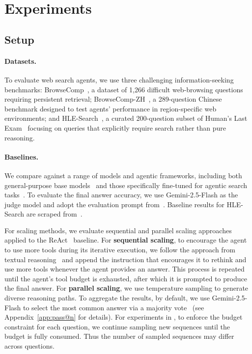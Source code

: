 \section{Experiments}\label{sec:exp}



\subsection{Setup}

\paragraph{Datasets.}To evaluate web search agents, we use three challenging information-seeking benchmarks: BrowseComp~\citep{DBLP:journals/corr/abs-2504-12516}, a dataset of 1,266 difficult web-browsing questions requiring persistent retrieval; BrowseComp-ZH~\citep{DBLP:journals/corr/abs-2504-19314}, a 289-question Chinese benchmark designed to test agents’ performance in region-specific web environments; and HLE-Search~\citep{DBLP:journals/corr/abs-2507-16075}, a curated 200-question subset of Human’s Last Exam~\citep{DBLP:journals/corr/abs-2501-14249} focusing on queries that explicitly require search rather than pure reasoning. 


\paragraph{Baselines.}
We compare \method against a range of models and agentic frameworks, including both general-purpose base models~\citep{DBLP:journals/corr/abs-2410-21276, DBLP:journals/corr/abs-2412-16720, gemini25, anthropic2025claude37sonnet, anthropic2025claude4} and those specifically fine-tuned for agentic search tasks~\citep{DBLP:journals/corr/abs-2507-02592, Liu2025WebExplorerEA, DBLP:journals/corr/abs-2508-07976,lu2025deepdiveadvancingdeepsearch}.
To evaluate the final answer accuracy, we use Gemini-2.5-Flash as the judge model and adopt the evaluation prompt from~\citet{DBLP:journals/corr/abs-2501-14249}. Baseline results for HLE-Search are scraped from~\citet{DBLP:journals/corr/abs-2507-16075}.

For scaling methods, we evaluate sequential and parallel scaling approaches applied to the ReAct~\citep{DBLP:conf/iclr/YaoZYDSN023} baseline.
For \textbf{sequential scaling}, to encourage the agent to use more tools during its iterative execution, we follow the approach from textual reasoning~\citep{DBLP:journals/corr/abs-2501-19393} and append the instruction that encourages it to rethink and use more tools whenever the agent provides an answer. This process is repeated until the agent's tool budget is exhausted, after which it is prompted to produce the final answer.
For \textbf{parallel scaling}, we use temperature sampling to generate diverse reasoning paths. To aggregate the results, by default, we use Gemini-2.5-Flash to select the most common answer via a majority vote~\citep{DBLP:conf/iclr/0002WSLCNCZ23} (see Appendix~\ref{app:pass@n} for details). For experiments in \method, to enforce the budget constraint for each question, we continue sampling new sequences until the budget is fully consumed. Thus the number of sampled sequences may differ across questions.


